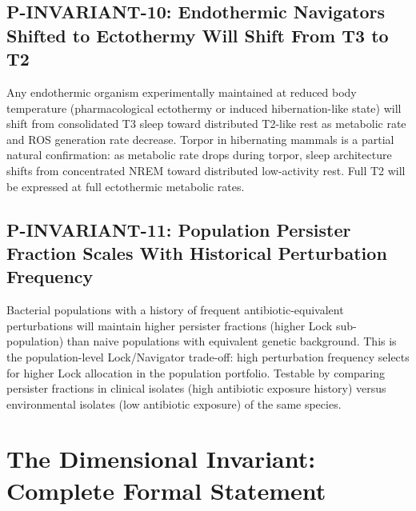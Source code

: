 \documentclass[10pt, a4paper]{article}
\begin{document}
\subsection{P-INVARIANT-10: Endothermic
Navigators Shifted to Ectothermy Will
Shift From T3 to T2}

Any endothermic organism experimentally
maintained at reduced body temperature
(pharmacological ectothermy or induced
hibernation-like state) will shift from
consolidated T3 sleep toward distributed
T2-like rest as metabolic rate and ROS
generation rate decrease. Torpor in
hibernating mammals is a partial natural
confirmation: as metabolic rate drops
during torpor, sleep architecture shifts
from concentrated NREM toward distributed
low-activity rest. Full T2 will be
expressed at full ectothermic metabolic
rates.

\subsection{P-INVARIANT-11: Population
Persister Fraction Scales With Historical
Perturbation Frequency}

Bacterial populations with a history of
frequent antibiotic-equivalent
perturbations will maintain higher
persister fractions (higher Lock
sub-population) than naive populations
with equivalent genetic background.
This is the population-level Lock/Navigator
trade-off: high perturbation frequency
selects for higher Lock allocation in
the population portfolio. Testable by
comparing persister fractions in
clinical isolates (high antibiotic
exposure history) versus environmental
isolates (low antibiotic exposure) of
the same species.

\section{The Dimensional Invariant:
Complete Formal Statement}
\label{sec:statement}
\end{document}
